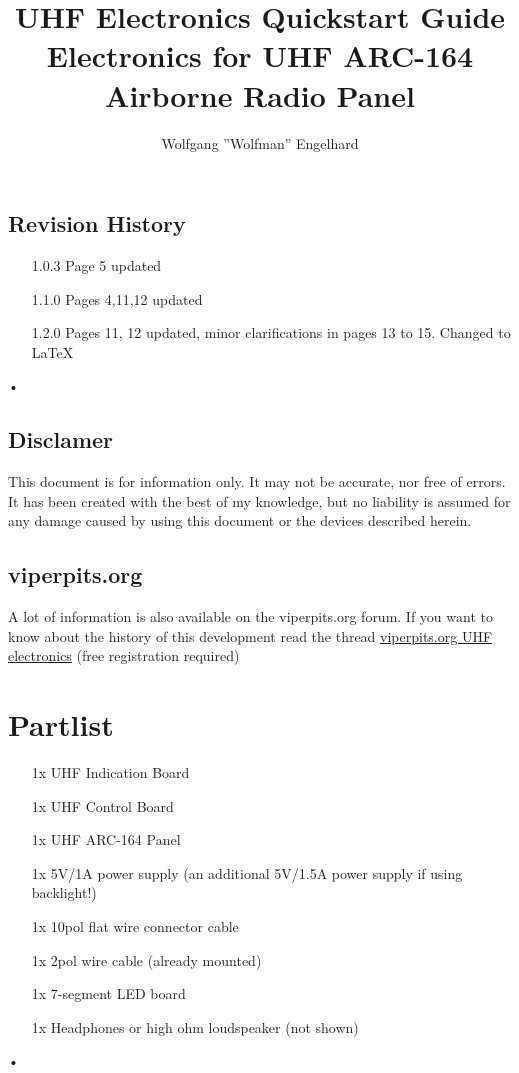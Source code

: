 \documentclass[12pt, a4paper]{report}
\begin{document}
\title{UHF Electronics Quickstart Guide\\\large Electronics for UHF ARC-164 Airborne Radio Panel}
\author{Wolfgang ''Wolfman'' Engelhard }
\maketitle

\pagestyle {plain}

\section{Revision History}
\begin{itemize}
\item[1.0.3]
Page 5 updated
\item[1.1.0]
Pages 4,11,12 updated
\item[1.2.0]
Pages 11, 12 updated, minor clarifications in pages 13 to 15. Changed to \LaTeX
\end{itemize}•

\section{Disclamer}
This document is for information only. It may not be accurate, nor free of errors. It has been created with the best of my knowledge, but no liability is assumed for any damage caused by using this document or the devices described herein.

\section{viperpits.org}
A lot of information is also available on the viperpits.org forum. If you want to know about the history of this development read the thread
\href{http://www.viperpits.org/smf/index.php?topic=5082.0}{viperpits.org UHF electronics}
(free registration required)

\chapter{Partlist}
\begin{itemize}
\item[1x]
UHF Indication Board
\item[1x]
UHF Control Board
\item[1x]
UHF ARC-164 Panel
\item[1x]
5V\slash 1A power supply (an additional 5V\slash1.5A power supply if using backlight!)
\item[1x]
10pol flat wire connector cable
\item[1x]
2pol wire cable (already mounted)
\item[1x]
7-segment LED board
\item[1x]
Headphones or high ohm loudspeaker (not shown)
\end{itemize}•
\end{document}
